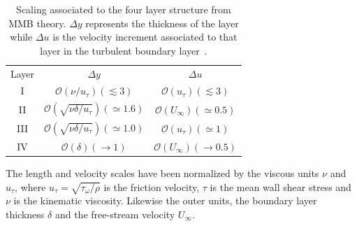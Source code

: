 \documentclass[aps,reprint,amsmath,amssymb,pra,floatfix]{revtex4-1}%
\begin{document}
\begin{table}[htb]%
\caption{\label{tab:4layerstructure}%
Scaling associated to the four layer structure from MMB theory. $\Delta y$ represents the thickness of the layer while $\Delta u$ is the velocity increment associated to that layer in the turbulent boundary layer~\citep{Klewickimmb}.
}
\begin{ruledtabular}
\begin{tabular}{ccc}
\textrm{Layer}&
\textrm{$\Delta y$}&
\textrm{$\Delta u$}\\
\colrule
I &$\mathcal{O}(\nu/u_{\tau})(\lesssim 3)$&$\mathcal{O}(u_{\tau})(\lesssim 3)$\\
II &$\mathcal{O}(\sqrt{\nu\delta/u_{\tau}})(\simeq 1.6)$&$\mathcal{O}(U_{\infty})(\simeq 0.5)$\\
III &$\mathcal{O}(\sqrt{\nu\delta/u_{\tau}})(\simeq 1.0)$&$\mathcal{O}(u_{\tau})(\simeq 1)$\\
IV &$\mathcal{O}(\delta)(\rightarrow 1)$&$\mathcal{O}(U_{\infty})(\rightarrow 0.5)$ \\
\end{tabular}
\end{ruledtabular}
\end{table}
The length and velocity scales have been normalized by the viscous units $\nu$ and $u_{\tau}$, where $u_{\tau}=\sqrt{\tau_{\omega}/\rho}$ is the friction velocity, $\tau$ is the mean wall shear stress and $\nu$ is the kinematic viscosity. Likewise the outer units, the boundary layer thickness $\delta$ and the free-stream velocity $U_{\infty}$. 
\end{document}
